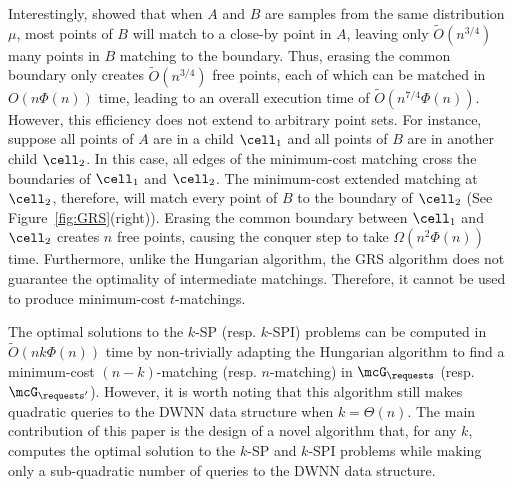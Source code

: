 Interestingly, \citet{gattani2023robust} showed that when $A$ and $B$ are samples from the same distribution $\mu$, most points of $B$ will match to a close-by point in $A$, leaving only $\tilde{O}(n^{3/4})$ many points in $B$ matching to the boundary. Thus, erasing the common boundary only creates $\tilde{O}(n^{3/4})$ free points, each of which can be matched in $O(n\Phi(n))$ time, leading to an overall execution time of $\tilde{O}(n^{7/4}\Phi(n))$. However, this efficiency does not extend to arbitrary point sets. For instance, suppose all points of $A$ are in a child $\cell_1$ and all points of $B$ are in another child $\cell_2$. In this case, all edges of the minimum-cost matching cross the boundaries of $\cell_1$ and $\cell_2$. The minimum-cost extended matching at $\cell_2$, therefore, will match every point of $B$ to the boundary of $\cell_2$ (See Figure~\ref{fig:GRS}(right)). Erasing the common boundary between $\cell_1$ and $\cell_2$ creates $n$ free points, causing the conquer step to take $\Omega(n^2\Phi(n))$ time. Furthermore, unlike the Hungarian algorithm, the GRS algorithm does not guarantee the optimality of intermediate matchings. Therefore, it cannot be used to produce minimum-cost $t$-matchings. 


%

%




%


%
%

%
%
%
%
%
%
%
%
%
%
%
%

 
%






%

%


%


%
 
%
 

%
%

%
%
%
%



%
%
%
%
%
%
%


%



%


%


  
 

%


The optimal solutions to the $k$-SP (resp. $k$-SPI) problems can be computed in $\tilde{O}(nk\Phi(n))$ time by non-trivially adapting the Hungarian algorithm to find a minimum-cost $(n-k)$-matching (resp. $n$-matching) in $\mcG_{\requests}$ (resp. $\mcG_{\requests'}$). 
%
However, it is worth noting that this algorithm still makes quadratic queries to the DWNN data structure when $k = \Theta(n)$. The main contribution of this paper is the design of a novel algorithm that, for any $k$, computes the optimal solution to the $k$-SP and $k$-SPI problems while making only a sub-quadratic number of queries to the DWNN data structure. 

